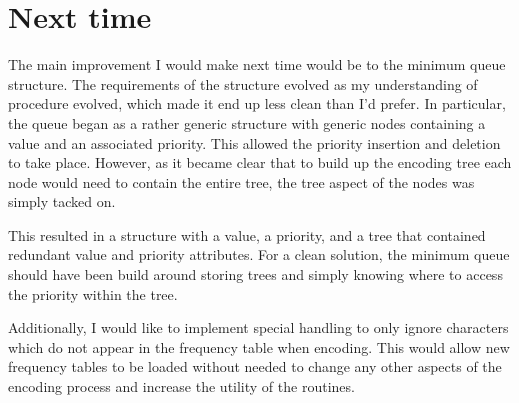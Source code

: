 \documentclass[a4paper,12pt]{article}
\begin{document}

\section{Next time}
The main improvement I would make next time would be to the minimum queue structure.  The requirements of the structure evolved as my understanding of procedure evolved, which made it end up less clean than I'd prefer.  In particular, the queue began as a rather generic structure with generic nodes containing a value and an associated priority.  This allowed the priority insertion and deletion to take place.  However, as it became clear that to build up the encoding tree each node would need to contain the entire tree, the tree aspect of the nodes was simply tacked on.

This resulted in a structure with a value, a priority, and a tree that contained redundant value and priority attributes.  For a clean solution, the minimum queue should have been build around storing trees and simply knowing where to access the priority within the tree.

Additionally, I would like to implement special handling to only ignore characters which do not appear in the frequency table when encoding. This would allow new frequency tables to be loaded without needed to change any other aspects of the encoding process and increase the utility of the routines.

\end{document}
